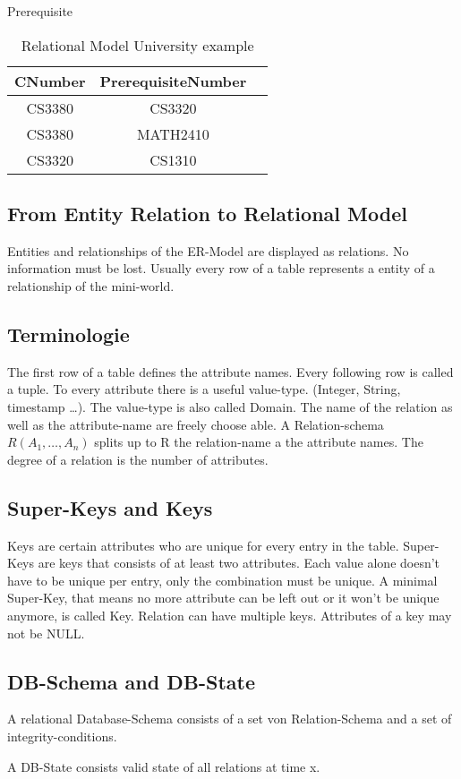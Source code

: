 \begin{table}[h]
Prerequisite\\
\begin{tabular}{|c|c|c|}
\hline
CNumber & PrerequisiteNumber\\
\hline
CS3380 & CS3320\\
\hline
CS3380 & MATH2410\\
\hline
CS3320 & CS1310\\
\hline
\end{tabular}

\caption{Relational Model University example}
\label{tab:is:rm:uniexample}
\end{table}

\subsection{From Entity Relation to Relational Model}
Entities and relationships of the ER-Model are displayed as relations. No
information must be lost. Usually every row of a table represents a entity of a
relationship of the mini-world.

\subsection{Terminologie}
The first row of a table defines the attribute names. Every following row
is called a tuple. To every attribute there is a useful value-type. (Integer,
String, timestamp \dots). The value-type is also called Domain. The name of the
relation as well as the attribute-name are freely choose able. A
Relation-schema $R(A_1, \dots , A_n)$ splits up to R the relation-name a the
attribute names. The degree of a relation is the number of attributes.

\subsection{Super-Keys and Keys}
Keys are certain attributes who are unique for every entry in the table.
Super-Keys are keys that consists of at least two attributes. Each value alone
doesn't have to be unique per entry, only the combination must be unique. A
minimal Super-Key, that means no more attribute can be left out or it won't be
unique anymore, is called Key. Relation can have multiple keys. Attributes of a
key may not be NULL.

\subsection{DB-Schema and DB-State}
A relational Database-Schema consists of a set von Relation-Schema and a set of
integrity-conditions.

A DB-State consists valid state of all relations at time x.
